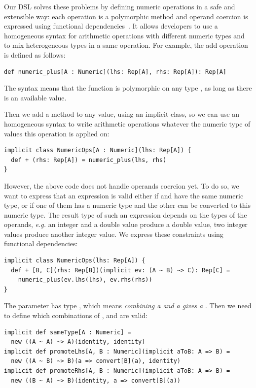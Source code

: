 \documentclass[american,english,runningheads]{llncs}
\newcommand{\eg}{\emph{e.g.}}
\begin{document}
Our DSL solves these problems by defining numeric operations in a safe and extensible way: each operation is a polymorphic method and operand coercion is expressed using functional dependencies~\cite{Jones00_FunDeps}. It allows developers to use a homogeneous syntax for arithmetic operations with different numeric types and to mix heterogeneous types in a same operation. For example, the add operation is defined as follows:

\begin{lstlisting}
def numeric_plus[A : Numeric](lhs: Rep[A], rhs: Rep[A]): Rep[A]
\end{lstlisting}

The  syntax means that the function is polymorphic on any type , as long as there is an available  value.

Then we add a \code{+} method to any  value, using an implicit class, so we can use an homogeneous syntax to write arithmetic operations whatever the numeric type of values this operation is applied on:

\begin{lstlisting}
implicit class NumericOps[A : Numeric](lhs: Rep[A]) {
  def + (rhs: Rep[A]) = numeric_plus(lhs, rhs)
}
\end{lstlisting}

However, the above code does not handle operands coercion yet. To do so, we want to express that an expression  is valid either if  and  have the same numeric type, or if one of them has a numeric type and the other can be converted to this numeric type. The result type of such an expression depends on the types of the operands, \eg{} an integer and a double value produce a double value, two integer values produce another integer value. We express these constraints using functional dependencies:

\begin{lstlisting}
implicit class NumericOps(lhs: Rep[A]) {
  def + [B, C](rhs: Rep[B])(implicit ev: (A ~ B) ~> C): Rep[C] =
    numeric_plus(ev.lhs(lhs), ev.rhs(rhs))
}
\end{lstlisting}

The  parameter has type , which means \emph{combining a  and a  gives a }. Then we need to define which combinations of ,  and  are valid:

\begin{lstlisting}
implicit def sameType[A : Numeric] =
  new ((A ~ A) ~> A)(identity, identity)
implicit def promoteLhs[A, B : Numeric](implicit aToB: A => B) =
  new ((A ~ B) ~> B)(a => convert[B](a), identity)
implicit def promoteRhs[A, B : Numeric](implicit aToB: A => B) =
  new ((B ~ A) ~> B)(identity, a => convert[B](a))
\end{lstlisting}
\end{document}
